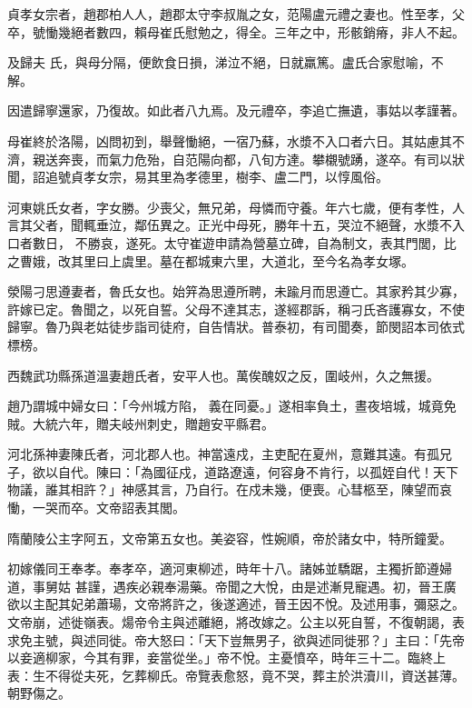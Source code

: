 \begin{pinyinscope}
 貞孝女宗者，趙郡柏人人，趙郡太守李叔胤之女，范陽盧元禮之妻也。性至孝，父卒，號慟幾絕者數四，賴母崔氏慰勉之，得全。三年之中，形骸銷瘠，非人不起。



 及歸夫
 氏，與母分隔，便飲食日損，涕泣不絕，日就羸篤。盧氏合家慰喻，不解。



 因遣歸寧還家，乃復故。如此者八九焉。及元禮卒，李追亡撫遺，事姑以孝謹著。



 母崔終於洛陽，凶問初到，舉聲慟絕，一宿乃蘇，水漿不入口者六日。其姑慮其不濟，親送奔喪，而氣力危殆，自范陽向都，八旬方達。攀櫬號踴，遂卒。有司以狀聞，詔追號貞孝女宗，易其里為孝德里，樹李、盧二門，以惇風俗。



 河東姚氏女者，字女勝。少喪父，無兄弟，母憐而守養。年六七歲，便有孝性，人言其父者，聞輒垂泣，鄰伍異之。正光中母死，勝年十五，哭泣不絕聲，水漿不入口者數日，
 不勝哀，遂死。太守崔遊申請為營墓立碑，自為制文，表其門閭，比之曹娥，改其里曰上虞里。墓在都城東六里，大道北，至今名為孝女塚。



 滎陽刁思遵妻者，魯氏女也。始笄為思遵所聘，未踰月而思遵亡。其家矜其少寡，許嫁已定。魯聞之，以死自誓。父母不達其志，遂經郡訴，稱刁氏吝護寡女，不使歸寧。魯乃與老姑徒步詣司徒府，自告情狀。普泰初，有司聞奏，節閔詔本司依式標榜。



 西魏武功縣孫道溫妻趙氏者，安平人也。萬俟醜奴之反，圍岐州，久之無援。



 趙乃謂城中婦女曰：「今州城方陷，
 義在同憂。」遂相率負土，晝夜培城，城竟免賊。大統六年，贈夫岐州刺史，贈趙安平縣君。



 河北孫神妻陳氏者，河北郡人也。神當遠戍，主吏配在夏州，意難其遠。有孤兄子，欲以自代。陳曰：「為國征戍，道路遼遠，何容身不肯行，以孤姪自代！天下物議，誰其相許？」神感其言，乃自行。在戍未幾，便喪。心彗柩至，陳望而哀慟，一哭而卒。文帝詔表其閭。



 隋蘭陵公主字阿五，文帝第五女也。美姿容，性婉順，帝於諸女中，特所鐘愛。



 初嫁儀同王奉孝。奉孝卒，適河東柳述，時年十八。諸姊並驕踞，主獨折節遵婦道，事舅姑
 甚謹，遇疾必親奉湯藥。帝聞之大悅，由是述漸見寵遇。初，晉王廣欲以主配其妃弟蕭瑒，文帝將許之，後遂適述，晉王因不悅。及述用事，彌惡之。文帝崩，述徙嶺表。煬帝令主與述離絕，將改嫁之。公主以死自誓，不復朝謁，表求免主號，與述同徙。帝大怒曰：「天下豈無男子，欲與述同徙邪？」主曰：「先帝以妾適柳家，今其有罪，妾當從坐。」帝不悅。主憂憤卒，時年三十二。臨終上表：生不得從夫死，乞葬柳氏。帝覽表愈怒，竟不哭，葬主於洪瀆川，資送甚薄。朝野傷之。




\end{pinyinscope}
